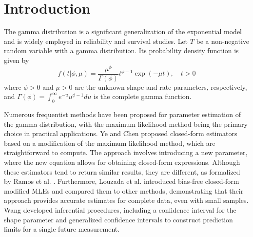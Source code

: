 \documentclass[]{interact}
\theoremstyle{plain}%
\theoremstyle{definition}
\theoremstyle{remark}
\begin{document}
\section{Introduction}



The gamma distribution is a significant generalization of the exponential model and is widely employed in reliability and survival studies. Let $T$ be a non-negative random variable with a gamma distribution. Its probability density function is given by
\begin{equation}\label{fdpgamma}
f(t|\phi,\mu)= \frac{\mu^\phi}{\Gamma(\phi)}t^{\phi-1}\exp(-\mu t) ,\quad t>0
\end{equation}
where $\phi>0$ and $\mu>0$ are the unknown shape and rate parameters, respectively, and $\Gamma(\phi)=\int_{0}^{\infty}{e^{-u}u^{\phi-1}du}$ is the complete gamma function. 

Numerous frequentist methods have been proposed for parameter estimation of the gamma distribution, with the maximum likelihood method being the primary choice in practical applications. {\color{black} Ye and Chen \cite{ye2017closed} proposed closed-form estimators based on a modification of the maximum likelihood method, which are straightforward to compute. The approach involves introducing a new parameter, where the new equation allows for obtaining closed-form expressions. Although these estimators tend to return similar results, they are different, as formalized by Ramos et al. \cite{ramos2023asymptotic}. Furthermore, Louzada et al. \cite{louzada2019note} introduced bias-free closed-form modified MLEs and compared them to other methods, demonstrating that their approach provides accurate estimates for complete data, even with small samples.} Wang \cite{wang2018inference} developed inferential procedures, including a confidence interval for the shape parameter and generalized confidence intervals to construct prediction limits for a single future measurement. 
\end{document}
